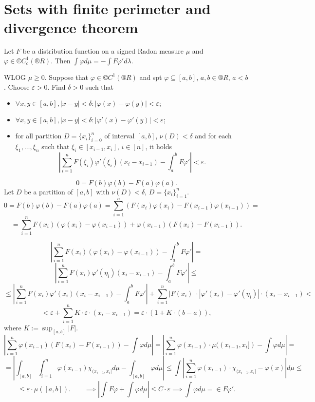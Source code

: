 \documentclass[12pt]{article}					%
\begin{document}
\section{Sets with finite perimeter and divergence theorem}
\begin{lemma}
	Let $F$ be a distribution function on a signed Radon measure $μ$ and $φ \in ©C_c^1(®R)$. Then $\int φ dμ = -\int F φ' dλ$.

	\begin{dukazin}
		WLOG $μ ≥ 0$. Suppose that $φ \in ©C^1(®R)$ and spt $φ \subseteq [a, b]$, $a, b \in ®R$, $a < b$. Choose $ε > 0$. Find $δ > 0$ such that
		\begin{itemize}
			\item $\forall x, y \in [a, b], |x - y| < δ: |φ(x) - φ(y)| < ε$;
			\item $\forall x, y \in [a, b], |x - y| < δ: |φ'(x) - φ'(y)| < ε$;
			\item for all partition $D = \{x_i\}_{i=0}^n$ of interval $[a, b]$, $ν(D) < δ$ and for each $ξ_1, …, ξ_n$ such that $ξ_i \in [x_{i-1}, x_i]$, $i \in [n]$, it holds
				$$ \left|\sum_{i=1}^n F(ξ_i) φ'(ξ_i)(x_i - x_{i-1}) - \int_a^b F φ'\right| < ε. $$
		\end{itemize}\vspace{-1em}

		$$ 0 = F(b)φ(b) - F(a)φ(a). $$
		Let $D$ be a partition of $[a, b]$ with $ν(D) < δ$, $D = \{x_i\}_{i=1}^n$.
		$$ 0 = F(b)φ(b) - F(a)φ(a) = \sum_{i=1}^n(F(x_i)φ(x_i) - F(x_{i-1})φ(x_{i-1})) = $$
		$$ = \sum_{i=1}^n F(x_i)(φ(x_i) - φ(x_{i-1})) + φ(x_{i-1})(F(x_i) - F(x_{i-1})). $$

		$$ \left|\sum_{i=1}^n F(x_i) (φ(x_i) - φ(x_{i-1})) - \int_a^b F φ'\right| = $$
		$$ \left|\sum_{i=1}^n F(x_i) φ'(η_i)(x_i - x_{i-1}) - \int_a^b F φ'\right| ≤ $$
		$$ ≤ \left|\sum_{i=1}^n F(x_i) φ'(x_i)(x_i - x_{i-1}) - \int_a^b F φ'\right| + \sum_{i=1}^n|F(x_i)|·|φ'(x_i) - φ'(η_i)|·(x_i - x_{i-1}) < $$
		$$ < ε + \sum_{i=1}^n K·ε·(x_i - x_{i-1}) = ε·(1 + K·(b - a)), $$
		where $K := \sup_{[a, b]} |F|$.
		$$ \left|\sum_{i=1}^n φ(x_{i-1})(F(x_i) - F(x_{i-1})) - \int φ dμ\right| = \left|\sum_{i=1}^n φ(x_{i-1})·μ((x_{i-1}, x_i]) - \int φ dμ\right| = $$
		$$ = |\int_{[a, b]} \int_{i=1}^n φ(x_{i-1}) χ_{(x_{i-1}, x_i]} dμ - \int_{[a, b]} φ dμ| ≤ \int|\sum_{i=1}^n φ(x_{i-1})·χ_{(x_{i-1}, x_i]} - φ(x)| dμ ≤ $$
		$$ ≤ ε·μ([a, b]). \qquad \implies |\int F φ + \int φ dμ| ≤ C·ε \implies \int φ dμ = \in Fφ'. $$
	\end{dukazin}
\end{lemma}
\end{document}
